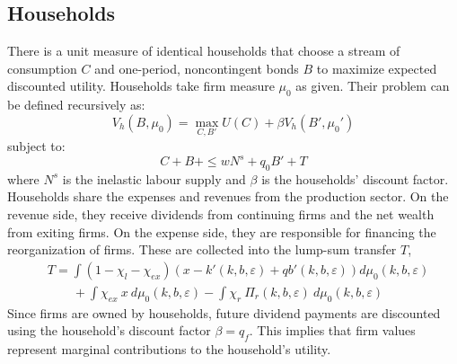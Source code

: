 \documentclass[12pt]{article}
\begin{document}
\subsection{Households}\label{sec:hh}
There is a unit measure of identical households that choose a stream of consumption $C$ and one-period, noncontingent bonds $B$ to maximize expected discounted utility. Households take firm measure $\mu_0$ as given. Their problem can be defined recursively as: 
\begin{equation} \label{eq:U_max}
V_h(B, \mu_0) = \max_{C,B'} U(C) + \beta V_h(B',\mu_0')
\end{equation}  
subject to: 
\begin{equation} \label{eq:const_hh}
C + B + \leq w N^s + q_0 B' + T
\end{equation} 
where $N^s$ is the inelastic labour supply and $\beta$ is the households' discount factor. \vspace{3mm} \\
Households share the expenses and revenues from the production sector. On the revenue side, they receive dividends from continuing firms and the net wealth from exiting firms. On the expense side, they are responsible for financing the reorganization of firms. These are collected into the lump-sum transfer $T$,
\begin{equation} \label{eq:T}
    \begin{split}
        & T = \int (1 - \chi_l - \chi_{ex}) \left( x - k'(k,b,\varepsilon) + qb'(k,b,\varepsilon) \right) d \mu_0(k,b,\varepsilon) \\
        & \qquad + \int \chi_{ex} \ x \ d \mu_0(k,b,\varepsilon) - \int \chi_{r} \ \Pi_r(k,b, \varepsilon) \ d \mu_0(k,b,\varepsilon)
    \end{split}
\end{equation}
Since firms are owned by households, future dividend payments are discounted using the household’s discount factor $\beta = q_f$. This implies that firm values represent marginal contributions to the household's utility.
\end{document}
